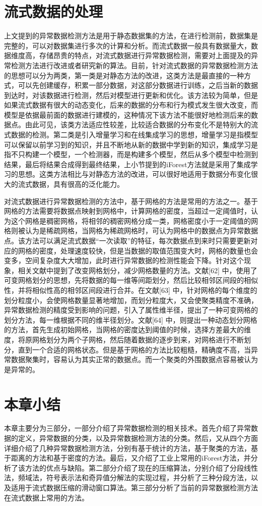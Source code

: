 \section{流式数据的处理}
上文提到的异常数据检测方法是用于静态数据集的方法，在进行检测前，数据集是完整的，可以对数据集进行多次的计算和分析。而流式数据一般具有数据量大，数据维度高，存储昂贵的特点，对流式数据进行异常数据检测，需要对上面提及的异常检测方法进行改进或者研究新的算法。目前，针对流式数据的异常数据检测方法的思想可以分为两类，第一类是对静态方法的改进，这类方法是最直接的一种方式，可以先创建缓存，积累一部分数据，对这部分数据进行训练，之后当新的数据到达时，对该数据进行检测，然后对模型进行更新和优化。该方法较为简单，但是如果流式数据有很大的动态变化，后来的数据的分布和行为模式发生很大改变，而模型是依据最前面的数据进行建模的，这种情况下该方法不能很好地检测后来的数据点。由此可见，该类方法适应性较差，比较适合数据的分布变化不是特别大的流式数据的检测。第二类是引入增量学习和在线集成学习的思想，增量学习是指模型可以保留以前学习到的知识，并且不断地从新的数据中学到新的知识，集成学习是指不只构建一个模型，一个检测器，而是构建多个模型，然后从多个模型中检测到结果，最后将结果合成得到最终结果，上小节提到的iForest方法就是采用了集成学习的思想。这类方法相比与对静态方法的改进，可以很好地适用于数据分布变化很大的流式数据，具有很高的泛化能力。 

对流式数据进行异常数据检测的方法中，基于网格的方法是常用的方法之一。基于网格的方法需要将数据点映射到网格中，计算网格的密度，当超过一定阈值时，认为这个网格是稠密网格，将相邻的稠密网格分成一类，网格密度小于一定阈值的网格则被认为是稀疏网格，当网格为稀疏网格时，可认为网格中的数据点为异常数据点。该方法可以满足流式数据“一次读取”的特征，每次数据点到来时只需要更新对应的网格的密度，处理速度较快，但是当数据的取值范围变大时，网格的数量也会变多，空间复杂度大大增加，此时进行异常数据的检测性能会下降。针对这个现象，相关文献中提到了改变网格划分，减少网格数量的方法。文献[62]%
中，使用了可变网格划分的思想，先将数据的每一维等间距划分，然后比较相邻区间段的相似性，并将相似性高的相邻区间段进行合并。在文献[63]%
中，针对网格的每个维度的划分粒度小，会使网格数量显著地增加，而划分粒度大，又会使聚类精度不准确，异常数据检测的精度受到影响的问题，引入了属性维半径，提出了一种可变网格的划分方法，每一维根据不同的维半径划分。文献[64]%
中，则提出一种动态划分网格的方法，首先生成初始网格，当网格的密度达到阈值的时候，选择方差最大的维度，将原网格划分为两个子网格，然后随着数据的逐步到来，对网格进行不断划分，直到一个合适的网格状态。但是基于网格的方法比较粗糙，精确度不高，当异常数据聚集时，容易认为其实正常的数据点。而一个聚类的外围数据点容易被认为是异常的。

\section{本章小结}
本章主要分为三部分，一部分介绍了异常数据检测的相关技术。首先介绍了异常数据的定义，异常数据的分类，以及异常数据检测方法的分类。然后，又从四个方面详细介绍了几种异常数据检测方法，分别有基于统计的方法，基于聚类的方法，基于距离的方法和基于密度的方法。最后，又介绍了工业上常用的iForest方法，并分析了该方法的优点与缺陷。第二部分介绍了现在的压缩算法，分别介绍了分段线性法，频域法，符号表示法和奇异值分解法的实现过程，并分析了三种分段方法，以及适用于流式数据压缩的滑动窗口算法。第三部分分析了当前的异常数据检测方法在流式数据上常用的方法。